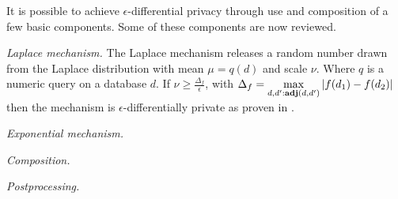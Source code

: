 \documentclass{article}
\begin{document}
It is possible to achieve $\epsilon$-differential privacy through use and composition of
a few basic components. Some of these components are now reviewed.

\noindent \emph{Laplace mechanism.}
The Laplace mechanism releases a random number drawn from the Laplace distribution with
mean $\mu=q(d)$ and scale $\nu$. Where $q$ is a numeric query on a database $d$.
If $\nu\geq \frac{\Delta_f}{\epsilon}$, with $\Delta_f=\displaystyle\max_{d,d':\textbf{adj}(d,d')}{\lvert f(d_1)-f(d_2)\lvert}$
then the mechanism is $\epsilon$-differentially private as proven in \cite{???}.

\noindent \emph{Exponential mechanism.}

\noindent \emph{Composition.}

\noindent \emph{Postprocessing.}
\end{document}
